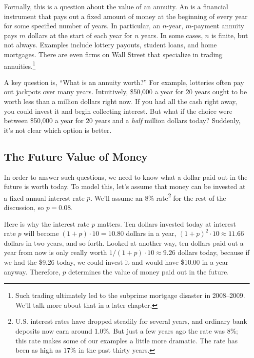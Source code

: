 Formally, this is a question about the value of an annuity.  An
 is a financial instrument that pays out a fixed amount
of money at the beginning of every year for some specified number of
years.  In particular, an $n$-year, $m$-payment annuity pays $m$
dollars at the start of each year for $n$ years.  In some cases, $n$
is finite, but not always.  Examples include lottery payouts, student
loans, and home mortgages.  There are even firms on Wall Street that
specialize in trading annuities.\footnote{Such trading ultimately led
  to the subprime mortgage disaster in 2008--2009.  We'll talk more
  about that in a later chapter.} 

A key question is, ``What is an annuity worth?''  For example,
lotteries often pay out jackpots over many years.  Intuitively,
\$50,000 a year for 20 years ought to be worth less than a million
dollars right now.  If you had all the cash right away, you could
invest it and begin collecting interest.  But what if the choice were
between \$50,000 a year for 20 years and a \emph{half} million
dollars today?  Suddenly, it's not clear which option is better.

\subsection{The Future Value of Money}

In order to answer such questions, we need to know what a dollar paid
out in the future is worth today.  To model this, let's assume that
money can be invested at a fixed annual interest rate $p$.  We'll
assume an 8\% rate\footnote{U.S. interest rates have dropped steadily
  for several years, and ordinary bank deposits now earn around 1.0\%.
  But just a few years ago the rate was 8\%; this rate makes some of
  our examples a little more dramatic.  The rate has been as high as
  17\% in the past thirty years.} for the rest of the discussion, so
$p = 0.08$.

Here is why the interest rate $p$ matters.  Ten dollars invested today
at interest rate $p$ will become $(1+p)\cdot 10 = 10.80$ dollars in a
year, $(1+p)^2\cdot 10 \approx 11.66$ dollars in two years, and so
forth.  Looked at another way, ten dollars paid out a year from now is
only really worth $1/(1+p) \cdot 10 \approx 9.26$ dollars today,
because if we had the \$9.26 today, we could invest it and would have
\$10.00 in a year anyway.  Therefore, $p$ determines the value of
money paid out in the future.

